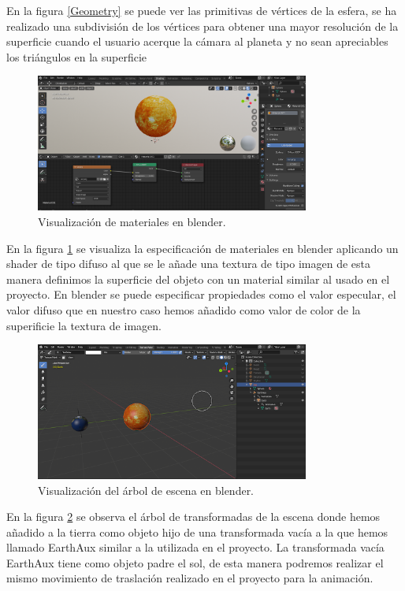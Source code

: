 \documentclass[a4paper]{book}
\begin{document}
En la figura \ref{Geometry} se puede ver las primitivas de vértices de la esfera, se ha realizado una subdivisión de los vértices para obtener una mayor
resolución de la superficie cuando el usuario acerque la cámara al planeta y no sean apreciables los triángulos en la superficie

\begin{figure}[H]
    \centering
    \includegraphics[width=9cm, keepaspectratio]{img/MaterialBlender.png}
    \caption{Visualización de materiales en blender.}
    \label{materialesBlender}
\end{figure}

En la figura \ref{materialesBlender} se visualiza la especificación de materiales en blender aplicando un shader de tipo difuso al que se le añade una
textura de tipo imagen de esta manera definimos la superficie del objeto con un material similar al usado en el proyecto. En blender
se puede especificar propiedades como el valor especular, el valor difuso que en nuestro caso hemos añadido como valor de color
de la superificie la textura de imagen.

\begin{figure}[H]
    \centering
    \includegraphics[width=9cm, keepaspectratio]{img/SceneSolar.png}
    \caption{Visualización del árbol de escena en blender.}
    \label{SceneSolar}
\end{figure}

En la figura \ref{SceneSolar} se observa el árbol de transformadas de la escena donde hemos añadido a la tierra como objeto hijo de una transformada
vacía a la que hemos llamado EarthAux similar a la utilizada en el proyecto. La transformada vacía EarthAux tiene como objeto padre el
sol, de esta manera podremos realizar el mismo movimiento de traslación realizado en el proyecto para la animación.
\end{document}
